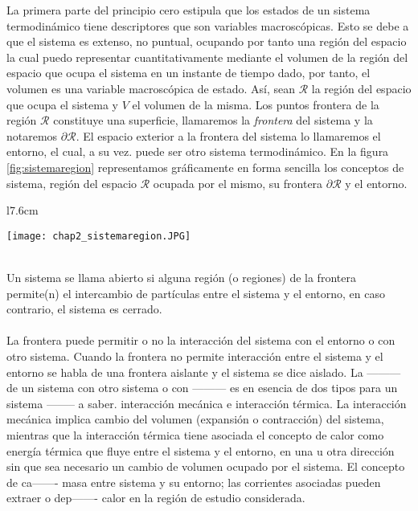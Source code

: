 La primera parte del principio cero estipula que los estados de un sistema termodinámico tiene descriptores que son variables macroscópicas. Esto se debe a que el sistema es extenso, no puntual, ocupando por tanto una región del espacio la cual puedo representar cuantitativamente mediante el volumen de la región del espacio que ocupa el sistema en un instante de tiempo dado, por tanto, el volumen es una variable macroscópica de estado. Así, sean $\mathcal{R}$ la región del espacio que ocupa el sistema y $V$ el volumen de la misma. Los puntos frontera de la región $\mathcal{R}$ constituye una superficie, llamaremos la {\it frontera} del sistema y la notaremos $\partial \mathcal{R}$. El espacio exterior a la frontera del sistema lo llamaremos el entorno, el cual, a su vez. puede ser otro sistema termodinámico. En la figura \ref{fig:sistemaregion} representamos gráficamente en forma sencilla los conceptos de sistema, región del espacio  $\mathcal{R}$ ocupada por el mismo, su frontera $\partial \mathcal{R}$ y el entorno.
\begin{wrapfigure}{l}{7.6cm}
\vspace{-20pt}
\begin{center}
\texttt{[image: chap2\_sistemaregion.JPG]}
\label{fig:sistemaregion}
\end{center}
\vspace{-20pt}
\end{wrapfigure}
\\ Un sistema se llama abierto si alguna región (o regiones) de la frontera permite(n) el intercambio de partículas entre el sistema y el entorno, en caso contrario, el sistema es cerrado.\\
\\
La frontera puede permitir o no la interacción del sistema con el entorno o con otro sistema. Cuando la frontera no permite interacción entre el sistema y el entorno se habla de una frontera aislante y el sistema se dice aislado. La --------- de un sistema con otro sistema o con --------- es en esencia de dos tipos para un sistema -------- a saber. interacción mecánica e interacción térmica. La interacción mecánica implica cambio del volumen (expansión o contracción) del sistema, mientras que la interacción térmica tiene asociada el concepto de calor como energía térmica que fluye entre el sistema y el entorno, en una u otra dirección sin que sea necesario un cambio de volumen ocupado por el sistema. El concepto de ca------- masa entre sistema y su entorno; las corrientes asociadas pueden extraer o dep------- calor en la región de estudio considerada.